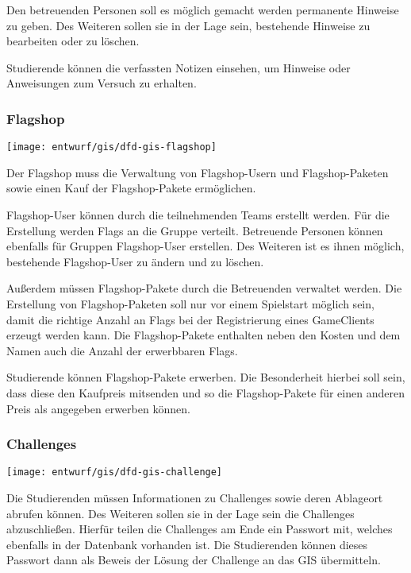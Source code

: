 Den betreuenden Personen soll es möglich gemacht werden permanente Hinweise zu geben. Des Weiteren sollen sie in der Lage sein, bestehende Hinweise zu bearbeiten oder zu löschen.

Studierende können die verfassten Notizen einsehen, um Hinweise oder Anweisungen zum Versuch zu erhalten.

\subsubsection{Flagshop}
\begin{center}
	\texttt{[image: entwurf/gis/dfd-gis-flagshop]}
\end{center}

Der Flagshop muss die Verwaltung von Flagshop-Usern und Flagshop-Paketen sowie einen Kauf der Flagshop-Pakete ermöglichen.

Flagshop-User können durch die teilnehmenden Teams erstellt werden. Für die Erstellung werden Flags an die Gruppe verteilt. Betreuende Personen können ebenfalls für Gruppen Flagshop-User erstellen. Des Weiteren ist es ihnen möglich, bestehende Flagshop-User zu ändern und zu löschen.

Außerdem müssen Flagshop-Pakete durch die Betreuenden verwaltet werden. Die Erstellung von Flagshop-Paketen soll nur vor einem Spielstart möglich sein, damit die richtige Anzahl an Flags bei der Registrierung eines GameClients erzeugt werden kann. Die Flagshop-Pakete enthalten neben den Kosten und dem Namen auch die Anzahl der erwerbbaren Flags.

Studierende können Flagshop-Pakete erwerben. Die Besonderheit hierbei soll sein, dass diese den Kaufpreis mitsenden und so die Flagshop-Pakete für einen anderen Preis als angegeben erwerben können.

\subsubsection{Challenges}
\begin{center}
	\texttt{[image: entwurf/gis/dfd-gis-challenge]}
\end{center}

Die Studierenden müssen Informationen zu Challenges sowie deren Ablageort abrufen können. Des Weiteren sollen sie in der Lage sein die Challenges abzuschließen. Hierfür teilen die Challenges am Ende ein Passwort mit, welches ebenfalls in der Datenbank vorhanden ist. Die Studierenden können dieses Passwort dann als Beweis der Lösung der Challenge an das GIS übermitteln.

